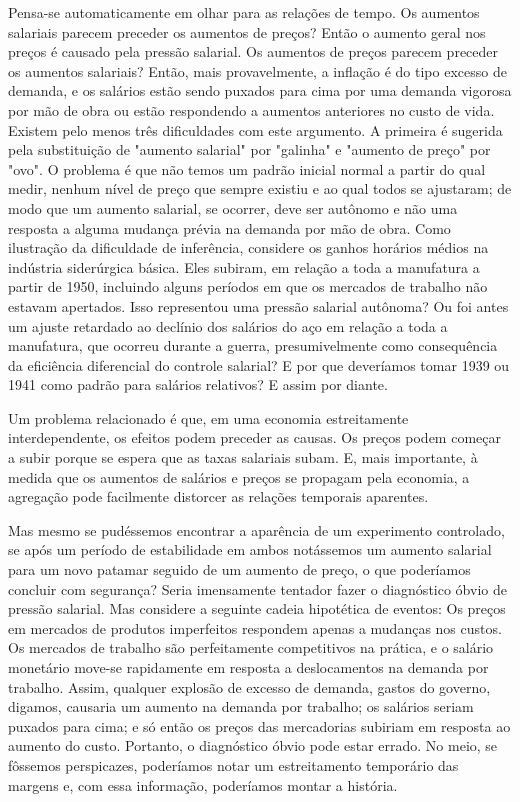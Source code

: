 \documentclass[12pt]{article}
\begin{document}
Pensa-se automaticamente em olhar para as relações de tempo. Os aumentos salariais parecem preceder os aumentos de preços? Então o aumento geral nos preços é causado pela pressão salarial. Os aumentos de preços parecem preceder os aumentos salariais? Então, mais provavelmente, a inflação é do tipo excesso de demanda, e os salários estão sendo puxados para cima por uma demanda vigorosa por mão de obra ou estão respondendo a aumentos anteriores no custo de vida. Existem pelo menos três dificuldades com este argumento. A primeira é sugerida pela substituição de "aumento salarial" por "galinha" e "aumento de preço" por "ovo". O problema é que não temos um padrão inicial normal a partir do qual medir, nenhum nível de preço que sempre existiu e ao qual todos se ajustaram; de modo que um aumento salarial, se ocorrer, deve ser autônomo e não uma resposta a alguma mudança prévia na demanda por mão de obra. Como ilustração da dificuldade de inferência, considere os ganhos horários médios na indústria siderúrgica básica. Eles subiram, em relação a toda a manufatura a partir de 1950, incluindo alguns períodos em que os mercados de trabalho não estavam apertados. Isso representou uma pressão salarial autônoma? Ou foi antes um ajuste retardado ao declínio dos salários do aço em relação a toda a manufatura, que ocorreu durante a guerra, presumivelmente como consequência da eficiência diferencial do controle salarial? E por que deveríamos tomar 1939 ou 1941 como padrão para salários relativos? E assim por diante.

Um problema relacionado é que, em uma economia estreitamente interdependente, os efeitos podem preceder as causas. Os preços podem começar a subir porque se espera que as taxas salariais subam. E, mais importante, à medida que os aumentos de salários e preços se propagam pela economia, a agregação pode facilmente distorcer as relações temporais aparentes.

Mas mesmo se pudéssemos encontrar a aparência de um experimento controlado, se após um período de estabilidade em ambos notássemos um aumento salarial para um novo patamar seguido de um aumento de preço, o que poderíamos concluir com segurança? Seria imensamente tentador fazer o diagnóstico óbvio de pressão salarial. Mas considere a seguinte cadeia hipotética de eventos: Os preços em mercados de produtos imperfeitos respondem apenas a mudanças nos custos. Os mercados de trabalho são perfeitamente competitivos na prática, e o salário monetário move-se rapidamente em resposta a deslocamentos na demanda por trabalho. Assim, qualquer explosão de excesso de demanda, gastos do governo, digamos, causaria um aumento na demanda por trabalho; os salários seriam puxados para cima; e só então os preços das mercadorias subiriam em resposta ao aumento do custo. Portanto, o diagnóstico óbvio pode estar errado. No meio, se fôssemos perspicazes, poderíamos notar um estreitamento temporário das margens e, com essa informação, poderíamos montar a história.
\end{document}
